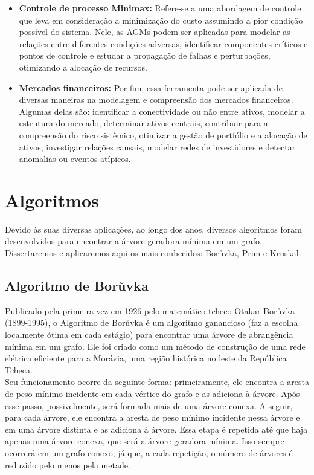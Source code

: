 \documentclass{article}
\begin{document}
\begin{itemize}
    \item \textbf{Controle de processo Minimax: } Refere-se a uma abordagem de controle que leva em consideração a minimização do custo assumindo a pior condição possível do sistema. Nele, as AGMs podem ser aplicadas para modelar as relações entre diferentes condições adversas, identificar componentes críticos e pontos de controle e estudar a propagação de falhas e perturbações, otimizando a alocação de recursos.
    
    \item \textbf{Mercados financeiros: } Por fim, essa ferramenta pode ser aplicada de diversas maneiras na modelagem e compreensão dos mercados financeiros. Algumas delas são: identificar a conectividade ou não entre ativos, modelar a estrutura do mercado, determinar ativos centrais, contribuir para a compreensão do risco sistêmico, otimizar a gestão de portfólio e a alocação de ativos, investigar relações causais, modelar redes de investidores e detectar anomalias ou eventos atípicos.
\end{itemize}

\section{Algoritmos}

Devido às suas diversas aplicações, ao longo dos anos, diversos algoritmos foram desenvolvidos para encontrar a árvore geradora mínima em um grafo. Dissertaremos e aplicaremos aqui os mais conhecidos: Borůvka, Prim e Kruskal.

\subsection{Algoritmo de Borůvka}

Publicado pela primeira vez em 1926 pelo matemático tcheco Otakar Borůvka (1899-1995), o Algoritmo de Borůvka é um algoritmo ganancioso (faz a escolha localmente ótima em cada estágio) para encontrar uma árvore de abrangência mínima em um grafo. Ele foi criado como um método de construção de uma rede elétrica eficiente para a Morávia, uma região histórica no leste da República Tcheca. \\

Seu funcionamento ocorre da seguinte forma: primeiramente, ele encontra a aresta de peso mínimo incidente em cada vértice do grafo e as adiciona à árvore. Após esse passo, possivelmente, será formada mais de uma árvore conexa. A seguir, para cada árvore, ele encontra a aresta de peso mínimo incidente nessa árvore e em uma árvore distinta e as adiciona à árvore. Essa etapa é repetida até que haja apenas uma árvore conexa, que será a árvore geradora mínima. Isso sempre ocorrerá em um grafo conexo, já que, a cada repetição, o número de árvores é reduzido pelo menos pela metade. \\
\end{document}
